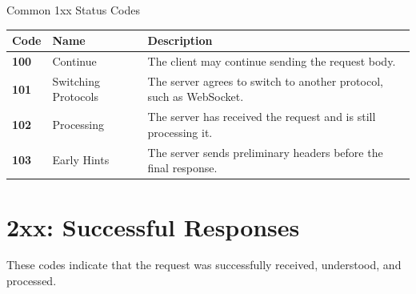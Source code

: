 \documentclass[a4paper]{article}
\begin{document}
        \begin{statuscategory}{Common 1xx Status Codes}
            \begin{longtable}{
                    >{\ttfamily\bfseries}p{1.5cm}
                p{4cm}
                p{8cm}
            }
                \toprule
                \textnormal{\textbf{Code}} &
                \textbf{Name} &
                \textbf{Description} \\
                \midrule
                100 &
                Continue &
                The client may continue sending the request body. \\
                
                101 &
                Switching Protocols &
                The server agrees to switch to another protocol, such as WebSocket. \\
                
                102 &
                Processing &
                The server has received the request and is still processing it. \\
                
                103 &
                Early Hints &
                The server sends preliminary headers before the final response. \\
                \bottomrule
            \end{longtable}
        \end{statuscategory}
    
    
    \section{2xx: Successful Responses}
        
        These codes indicate that the request was successfully received, understood,
        and processed.
        
\end{document}
